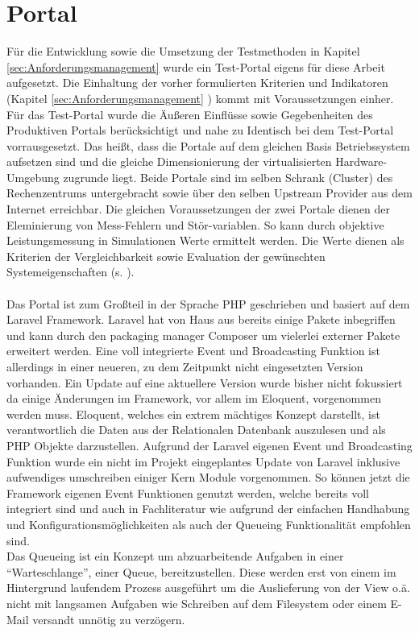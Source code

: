 \section{Portal}
\label{sec:In Portal}
Für die Entwicklung sowie die Umsetzung der Testmethoden in Kapitel \ref{sec:Anforderungsmanagement} \textit{} wurde ein Test-Portal eigens für diese Arbeit aufgesetzt. Die Einhaltung der vorher formulierten Kriterien und Indikatoren (Kapitel \ref{sec:Anforderungsmanagement} \textit{}) kommt mit Voraussetzungen einher. Für das Test-Portal wurde die Äußeren Einflüsse sowie Gegebenheiten des Produktiven Portals berücksichtigt und nahe zu Identisch bei dem Test-Portal vorrausgesetzt. Das heißt, dass die Portale auf dem gleichen Basis Betriebssystem aufsetzen sind und die gleiche Dimensionierung der virtualisierten Hardware-Umgebung zugrunde liegt. Beide Portale sind im selben Schrank (Cluster) des Rechenzentrums untergebracht sowie über den selben Upstream Provider aus dem Internet erreichbar. Die gleichen Voraussetzungen der zwei Portale dienen der Eleminierung von Mess-Fehlern und Stör-variablen. So kann durch objektive Leistungsmessung in Simulationen Werte ermittelt werden. Die Werte dienen als Kriterien der Vergleichbarkeit sowie Evaluation der gewünschten Systemeigenschaften (s. \cite{Usability Engineering} ). \\\\
Das Portal ist zum Großteil in der Sprache PHP geschrieben und basiert auf dem Laravel Framework. Laravel hat von Haus aus bereits einige Pakete inbegriffen und kann durch den packaging manager Composer um vielerlei externer Pakete erweitert werden. Eine voll integrierte Event und Broadcasting Funktion ist allerdings in einer neueren, zu dem Zeitpunkt nicht eingesetzten Version vorhanden. Ein Update auf eine aktuellere Version wurde bisher nicht fokussiert da einige Änderungen im Framework, vor allem im Eloquent, vorgenommen werden muss. Eloquent, welches ein extrem mächtiges Konzept darstellt, ist verantwortlich die Daten aus der Relationalen Datenbank auszulesen und als PHP Objekte darzustellen. 
Aufgrund der Laravel eigenen Event und Broadcasting Funktion wurde ein nicht im Projekt eingeplantes Update von Laravel inklusive aufwendiges umschreiben einiger Kern Module vorgenommen. So können jetzt die Framework eigenen Event Funktionen genutzt werden, welche bereits voll integriert sind und auch in Fachliteratur wie \cite{Laravel: Up and Running: A Framework for Building Modern PHP Apps} aufgrund der einfachen Handhabung und Konfigurationsmöglichkeiten als auch der Queueing Funktionalität empfohlen sind.\\ Das Queueing ist ein Konzept um abzuarbeitende Aufgaben in einer "`Warteschlange"', einer Queue, bereitzustellen. Diese werden erst von einem im Hintergrund laufendem Prozess ausgeführt um die Auslieferung von der View o.ä. nicht mit langsamen Aufgaben wie \zB Schreiben auf dem Filesystem oder einem E-Mail versandt unnötig zu verzögern.
